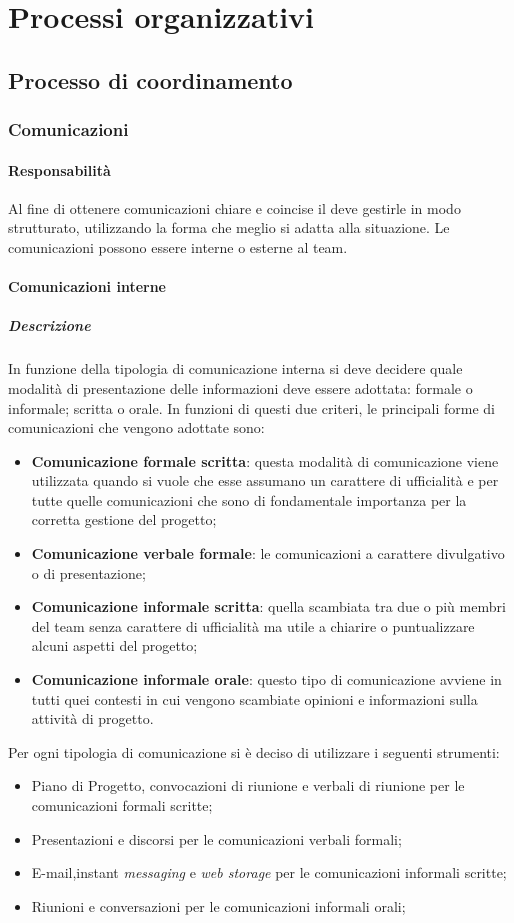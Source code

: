 
\section{Processi organizzativi}

\subsection{Processo di coordinamento}
\subsubsection{Comunicazioni}
\paragraph{Responsabilità}
Al fine di ottenere comunicazioni chiare e coincise il \textit{\RdP} deve gestirle in modo strutturato, utilizzando la forma che meglio si adatta alla situazione.
Le comunicazioni possono essere interne o esterne al team.
\paragraph{Comunicazioni interne}
\subparagraph{Descrizione}
In funzione della tipologia di comunicazione interna si deve decidere quale modalità di presentazione delle informazioni deve essere adottata: formale o informale; scritta o orale.
In funzioni di questi due criteri, le principali forme di comunicazioni che vengono adottate sono:
\begin{itemize}
\item
\textbf{Comunicazione formale scritta}: questa modalità di comunicazione viene utilizzata quando si 
vuole che esse assumano un carattere di ufficialità e per tutte quelle comunicazioni che sono di fondamentale importanza per la corretta gestione del progetto;
\item
\textbf{Comunicazione verbale formale}: le comunicazioni a carattere divulgativo o di presentazione;
\item
\textbf{Comunicazione informale scritta}: quella scambiata tra due o più membri del team senza carattere di ufficialità ma utile a chiarire o puntualizzare alcuni aspetti del progetto;
\item
\textbf{Comunicazione informale orale}: questo tipo di comunicazione avviene in tutti quei contesti in cui vengono scambiate opinioni e informazioni sulla attività di progetto.
\end{itemize}

Per ogni tipologia di comunicazione si è deciso di utilizzare i seguenti strumenti:
\begin{itemize}
\item
Piano di Progetto, convocazioni di riunione e verbali di riunione per le comunicazioni formali scritte;
\item
Presentazioni e discorsi per le comunicazioni verbali formali; 
\item
E-mail,instant \textit{messaging} e \textit{web storage} per le comunicazioni informali scritte;
\item
Riunioni e conversazioni per le comunicazioni informali orali; 
\end{itemize}

